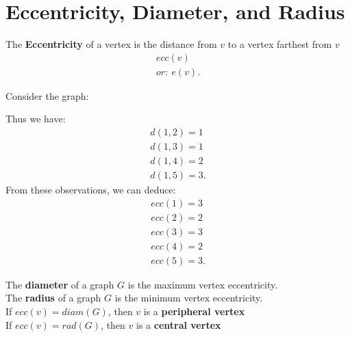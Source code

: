 \documentclass{report}
\begin{document}
    \pagebreak \bigbreak \noindent 
    \section{\LARGE Eccentricity, Diameter, and Radius}
    \bigbreak \noindent 
    \smallbreak \noindent
    \begin{definition}
          \item The \textbf{Eccentricity} of a vertex is the distance from $v$ to a vertex farthest from $v$
      \begin{align*}
          ecc(v) \\ 
          or:\ e(v)
        .\end{align*}
    \end{definition}
    \bigbreak \noindent 
    Consider the graph:
    \bigbreak \noindent 
    \begin{minipage}{0.47\textwidth}
    \end{minipage}
    \begin{minipage}{0.47\textwidth}
        Thus we have:
        \begin{align*}
            d(1,2) = 1 \\
            d(1,3) = 1 \\
            d(1,4) = 2\\ 
            d(1,5) =  3
        .\end{align*}
        From these observations, we can deduce:
        \begin{align*}
            ecc(1) = 3 \\
            ecc(2) = 2 \\
            ecc(3) = 3 \\
            ecc(4) = 2 \\
            ecc(5) = 3
        .\end{align*}
    \end{minipage}
    \bigbreak \noindent 
    \smallbreak \noindent
    \begin{definition}
       The \textbf{diameter} of a graph $G$ is the maximum vertex eccentricity. \\
       The \textbf{radius} of a graph $G$ is the minimum vertex eccentricity. \\
         If $ecc(v)  = diam(G)$, then $v$ is a \textbf{peripheral vertex} \\
       If $ecc(v) = rad(G)$, then $v$ is a \textbf{central vertex}
    \end{definition}
\end{document}
